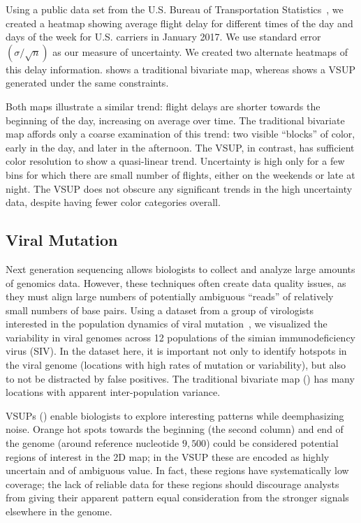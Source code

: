 \airlineFig

Using a public data set from the U.S. Bureau of Transportation Statistics~\cite{bts}, we created a heatmap showing average flight delay for different times of the day and days of the week for U.S. carriers in January 2017. We use standard error $\left(\sigma / \sqrt{n}\right)$ as our measure of uncertainty. We created two alternate heatmaps of this delay information.  shows a traditional bivariate map, whereas  shows a VSUP generated under the same constraints.

Both maps illustrate a similar trend: flight delays are shorter towards the beginning of the day, increasing on average over time. The traditional bivariate map affords only a coarse examination of this trend: two visible ``blocks'' of color, early in the day, and later in the afternoon. The VSUP, in contrast, has sufficient color resolution to show a quasi-linear trend. Uncertainty is high only for a few bins for which there are small number of flights, either on the weekends or late at night. The VSUP does not obscure any significant trends in the high uncertainty data, despite having fewer color categories overall.

\subsection{Viral Mutation}
\viralFig

Next generation sequencing allows biologists to collect and analyze large amounts of genomics data. However, these techniques often create data quality issues, as they must align large numbers of potentially ambiguous ``reads'' of relatively small numbers of base pairs. Using a dataset from a group of virologists interested in the population dynamics of viral mutation~\cite{o2012conditional}, we visualized the variability in viral genomes across 12 populations of the simian immunodeficiency virus (SIV). In the dataset here, it is important not only to identify hotspots in the viral genome (locations with high rates of mutation or variability), but also to not be distracted by false positives. The traditional bivariate map () has many locations with apparent inter-population variance.

VSUPs () enable biologists to explore interesting patterns while deemphasizing noise. Orange hot spots towards the beginning (the second column) and end of the genome (around reference nucleotide $9,500$) could be considered potential regions of interest in the 2D map; in the VSUP these are encoded as highly uncertain and of ambiguous value. In fact, these regions have systematically low coverage; the lack of reliable data for these regions should discourage analysts from giving their apparent pattern equal consideration from the stronger signals elsewhere in the genome.

